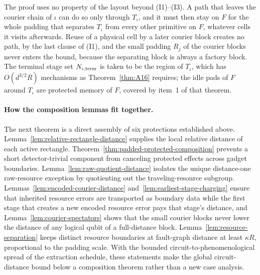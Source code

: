 \documentclass[aps,prx,reprint,superscriptaddress,nofootinbib,floatfix,longbibliography]{revtex4-2}
\theoremstyle{definition}
\begin{document}
The proof uses no property of the layout beyond (I1)--(I3).  A path that
leaves the courier chain of $\iota$ can do so only through $T_\iota$, and it
must then stay on $F$ for the whole padding that separates $T_\iota$ from
every other primitive on $F$, whatever cells it visits afterwards.  Reuse of
a physical cell by a later courier block creates no path, by the last clause
of (I1), and the small padding $R_j$ of the courier blocks never enters the
bound, because the separating block is always a factory block.  The terminal
stage set $N_{\iota,{\rm term}}$ is taken to be the region of $T_\iota$,
which has $O(d^{3/2}R)$ mechanisms as Theorem~\ref{thm:A16} requires; the
idle pads of $F$ around $T_\iota$ are protected memory of $F$, covered by
item~1 of that theorem.

\paragraph{How the composition lemmas fit together.}
The next theorem is a direct assembly of six protections established above.  Lemma~\ref{lem:relative-rectangle-distance} supplies the local relative distance of each active rectangle.  Theorem~\ref{thm:padded-protected-composition} prevents a short detector-trivial component from canceling protected effects across gadget boundaries.  Lemma~\ref{lem:raw-quotient-distance} isolates the unique distance-one raw-resource exception by quotienting out the traveling-resource subgroup.  Lemmas~\ref{lem:encoded-courier-distance} and~\ref{lem:earliest-stage-charging} ensure that inherited resource errors are transported as boundary data while the first stage that creates a new encoded resource error pays that stage's distance, and Lemma~\ref{lem:courier-spectators} shows that the small courier blocks never lower the distance of any logical qubit of a full-distance block.  Lemma~\ref{lem:resource-separation} keeps distinct resource boundaries at fault-graph distance at least $\kappa R$, proportional to the padding scale.  With the bounded circuit-to-phenomenological spread of the extraction schedule, these statements make the global circuit-distance bound below a composition theorem rather than a new case analysis.
\end{document}
